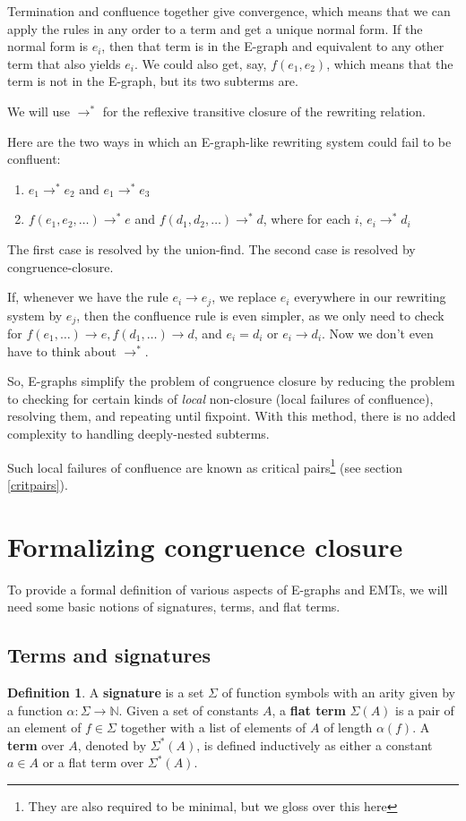 \documentclass[12pt,a4paper,twoside,openright]{report}
\numberwithin{equation}{chapter}		%
\numberwithin{figure}{chapter}			%
\numberwithin{table}{chapter}			%
\theoremstyle{definition}
\newtheorem*{definition}{Definition}
\theoremstyle{plain}
\begin{document}
Termination and confluence together give convergence, which means that we can apply the rules in any order to a term and get a unique normal form. If the normal form is $e_i$, then that term is in the E-graph and equivalent to any other term that also yields $e_i$. We could also get, say, $f(e_1, e_2)$, which means that the term is not in the E-graph, but its two subterms are.

We will use $\rightarrow^*$ for the reflexive transitive closure of the rewriting relation.

Here are the two ways in which an E-graph-like rewriting system could fail to be confluent:

\begin{enumerate}
	\item $e_1 \rightarrow^* e_2$ and $e_1 \rightarrow^* e_3$
	\item $f(e_1, e_2, \ldots) \rightarrow^* e$ and $f(d_1, d_2, \ldots) \rightarrow^* d$, where for each $i$, $e_i \rightarrow^* d_i$
\end{enumerate}

The first case is resolved by the union-find. The second case is resolved by congruence-closure.

If, whenever we have the rule $e_i \rightarrow e_j$, we replace $e_i$ everywhere in our rewriting system by $e_j$, then the confluence rule is even simpler, as we only need to check for $f(e_1, \ldots) \rightarrow e, f(d_1, \ldots) \rightarrow d$, and $e_i = d_i$ or $e_i \rightarrow d_i$. Now we don't even have to think about $\rightarrow^*$.

So, E-graphs simplify the problem of congruence closure by reducing the problem to checking for certain kinds of \emph{local} non-closure (local failures of confluence), resolving them, and repeating until fixpoint. With this method, there is no added complexity to handling deeply-nested subterms.

Such local failures of confluence are known as critical pairs\footnote{They are also required to be minimal, but we gloss over this here} (see section \ref{critpairs}).

\section{Formalizing congruence closure}
To provide a formal definition of various aspects of E-graphs and EMTs, we will need some basic notions of signatures, terms, and flat terms.

\subsection{Terms and signatures} \label{sig}
\begin{definition}
A \textbf{signature} is a set $\Sigma$ of function symbols with an arity given by a function $\alpha : \Sigma \rightarrow \mathbb{N}$. Given a set of constants $A$, a \textbf{flat term} $\Sigma(A)$ is a pair of an element of $f \in \Sigma$ together with a list of elements of $A$ of length $\alpha(f)$. A \textbf{term} over $A$, denoted by $\Sigma^*(A)$, is defined inductively as either a constant $a \in A$ or a flat term over $\Sigma^*(A)$.
\end{definition}
\end{document}
